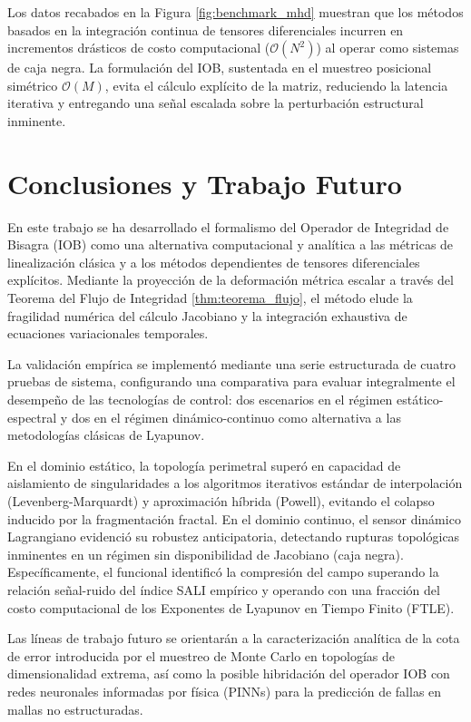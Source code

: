 \documentclass[11pt]{article}
\begin{document}
Los datos recabados en la Figura \ref{fig:benchmark_mhd} muestran que los métodos basados en la integración continua de tensores diferenciales incurren en incrementos drásticos de costo computacional ($\mathcal{O}(N^2)$) al operar como sistemas de caja negra. La formulación del IOB, sustentada en el muestreo posicional simétrico $\mathcal{O}(M)$, evita el cálculo explícito de la matriz, reduciendo la latencia iterativa y entregando una señal escalada sobre la perturbación estructural inminente.



\section{Conclusiones y Trabajo Futuro}

En este trabajo se ha desarrollado el formalismo del Operador de Integridad de Bisagra (IOB) como una alternativa computacional y analítica a las métricas de linealización clásica y a los métodos dependientes de tensores diferenciales explícitos. Mediante la proyección de la deformación métrica escalar a través del Teorema del Flujo de Integridad \ref{thm:teorema_flujo}, el método elude la fragilidad numérica del cálculo Jacobiano y la integración exhaustiva de ecuaciones variacionales temporales.

La validación empírica se implementó mediante una serie estructurada de cuatro pruebas de sistema, configurando una comparativa para evaluar integralmente el desempeño de las tecnologías de control: dos escenarios en el régimen estático-espectral y dos en el régimen dinámico-continuo como alternativa a las metodologías clásicas de Lyapunov. 

En el dominio estático, la topología perimetral superó en capacidad de aislamiento de singularidades a los algoritmos iterativos estándar de interpolación (Levenberg-Marquardt) y aproximación híbrida (Powell), evitando el colapso inducido por la fragmentación fractal. En el dominio continuo, el sensor dinámico Lagrangiano evidenció su robustez anticipatoria, detectando rupturas topológicas inminentes en un régimen sin disponibilidad de Jacobiano (caja negra). Específicamente, el funcional identificó la compresión del campo superando la relación señal-ruido del índice SALI empírico y operando con una fracción del costo computacional de los Exponentes de Lyapunov en Tiempo Finito (FTLE).

Las líneas de trabajo futuro se orientarán a la caracterización analítica de la cota de error introducida por el muestreo de Monte Carlo en topologías de dimensionalidad extrema, así como la posible hibridación del operador IOB con redes neuronales informadas por física (PINNs) para la predicción de fallas en mallas no estructuradas.
\end{document}

